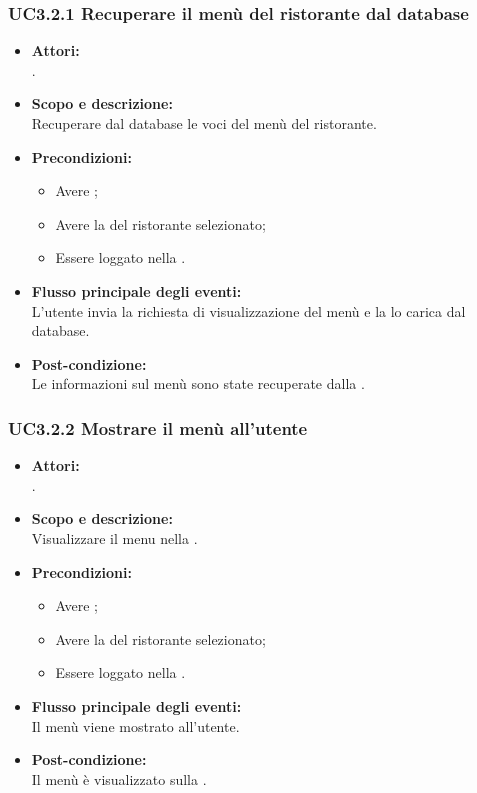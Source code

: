 \subsubsection{UC3.2.1 Recuperare il menù del ristorante dal database} \label{UC3.2.1}

\begin{itemize}
	\item \textbf{Attori:}
	\\.
	\item \textbf{Scopo e descrizione:} 
	\\Recuperare dal database le voci del menù del ristorante.
	\item \textbf{Precondizioni:}
	\begin{itemize}
		\item Avere ;
		\item Avere la  del ristorante selezionato;
		\item Essere loggato nella .
	\end{itemize}
	\item \textbf{Flusso principale degli eventi:}
	\\L'utente invia la richiesta di visualizzazione del menù e la  lo carica dal database.
	\item \textbf{Post-condizione:}
	\\Le informazioni sul menù sono state recuperate dalla .
\end{itemize}

\subsubsection{UC3.2.2 Mostrare il menù all'utente} \label{UC3.2.2}

\begin{itemize}
	\item \textbf{Attori:}
	\\.
	\item \textbf{Scopo e descrizione:} 
	\\Visualizzare il menu nella .
	\item \textbf{Precondizioni:}
	\begin{itemize}
		\item Avere ;
		\item Avere la  del ristorante selezionato;
		\item Essere loggato nella .
	\end{itemize}
	\item \textbf{Flusso principale degli eventi:}
	\\Il menù viene mostrato all'utente.
	\item \textbf{Post-condizione:}
	\\Il menù è visualizzato sulla .
\end{itemize}

